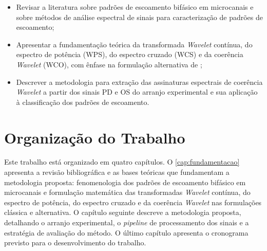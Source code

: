 \begin{itemize}
  \item Revisar a literatura sobre padrões de escoamento bifásico em microcanais e sobre
  métodos de análise espectral de sinais para caracterização de padrões de escoamento;
  \item Apresentar a fundamentação teórica da transformada \textit{Wavelet} contínua, do
  espectro de potência (WPS), do espectro cruzado (WCS) e da coerência \textit{Wavelet}
  (WCO), com ênfase na formulação alternativa de ;
  \item Descrever a metodologia para extração das assinaturas espectrais de coerência
  \textit{Wavelet} a partir dos sinais PD e OS do arranjo experimental e sua aplicação
  à classificação dos padrões de escoamento.
\end{itemize}

\section{Organização do Trabalho}

Este trabalho está organizado em quatro capítulos. O \autoref{cap:fundamentacao} apresenta
a revisão bibliográfica e as bases teóricas que fundamentam a metodologia proposta:
fenomenologia dos padrões de escoamento bifásico em microcanais e formulação matemática das
transformadas \textit{Wavelet} contínua, do espectro de potência, do espectro cruzado e da
coerência \textit{Wavelet} nas formulações clássica e alternativa. O capítulo seguinte
descreve a metodologia proposta, detalhando o arranjo experimental, o
\textit{pipeline} de processamento dos sinais e a estratégia de avaliação do método. O último
capítulo apresenta o cronograma previsto para o desenvolvimento do trabalho.
